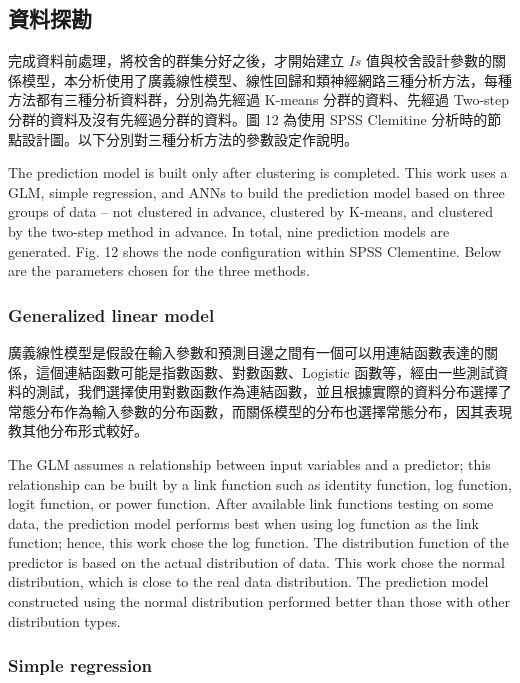 \subsection{資料探勘}

完成資料前處理，將校舍的群集分好之後，才開始建立 $Is$ 值與校舍設計參數的關係模型，本分析使用了廣義線性模型、線性回歸和類神經網路三種分析方法，每種方法都有三種分析資料群，分別為先經過 K-means 分群的資料、先經過 Two-step 分群的資料及沒有先經過分群的資料。圖 12 為使用 SPSS Clemitine 分析時的節點設計圖。以下分別對三種分析方法的參數設定作說明。

The prediction model is built only after clustering is completed. This work uses a GLM, simple regression, and ANNs to build the prediction model based on three groups of data – not clustered in advance, clustered by K-means, and clustered by the two-step method in advance. In total, nine prediction models are generated. Fig. 12 shows the node configuration within SPSS Clementine. Below are the parameters chosen for the three methods. 

\subsubsection{Generalized linear model}

廣義線性模型是假設在輸入參數和預測目邊之間有一個可以用連結函數表達的關係，這個連結函數可能是指數函數、對數函數、Logistic 函數等，經由一些測試資料的測試，我們選擇使用對數函數作為連結函數，並且根據實際的資料分布選擇了常態分布作為輸入參數的分布函數，而關係模型的分布也選擇常態分布，因其表現教其他分布形式較好。

The GLM assumes a relationship between input variables and a predictor; this relationship can be built by a link function such as identity function, log function, logit function, or power function. After available link functions testing on some data, the prediction model performs best when using log function as the link function; hence, this work chose the log function. The distribution function of the predictor is based on the actual distribution of data. This work chose the normal distribution, which is close to the real data distribution. The prediction model constructed using the normal distribution performed better than those with other distribution types.

\subsubsection{Simple regression}

